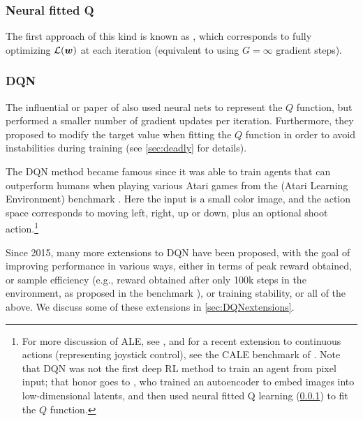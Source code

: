 \subsubsection{Neural fitted Q}
\label{sec:NFQ}

The first approach of this kind
is known as 
\citep{Riedmiller2005}, which corresponds to fully optimizing
$\mathcal{L}({\bm{w}})$ at each iteration (equivalent to using $G=\infty$
gradient steps).

\subsubsection{DQN}
\label{sec:DQN}

The influential
 or 
paper of \citep{Mnih2015atari}
also used neural nets to represent the $Q$ function,
but performed a smaller number of gradient updates
per iteration.
Furthermore, they proposed to modify the target value
when fitting the $Q$ function in order to avoid
instabilities during training (see \cref{sec:deadly} for details).

The DQN method became famous since it was able  to train
agents that can outperform
humans when playing various Atari games from
the  (Atari Learning Environment)
benchmark \citep{Bellemare13}.
Here the input is a small color image,
and the action space corresponds to moving left, right, up or down,
plus an optional shoot action.\footnote{
%
For more discussion of ALE,
see \citep{Machado2018},
and for a recent extension to continuous actions
(representing joystick control),
see the CALE benchmark of \citep{Farebrother2024CALE}.
Note that DQN was not the first deep RL method to train
an agent from pixel input;
that honor goes to \citep{Lange2010},
who trained an autoencoder to embed images into low-dimensional latents,
and then used neural fitted Q learning (\cref{sec:NFQ})
to fit the $Q$ function.
}

Since 2015, many more extensions to DQN have been proposed,
with the goal of
improving performance in various ways,
either in terms of peak reward obtained,
or sample efficiency (e.g., reward obtained after only 100k steps
in the environment, as proposed in the  benchmark
\citep{Atari100k}),
or training stability,
or all of the above.
We discuss some of these extensions in \cref{sec:DQNextensions}.



